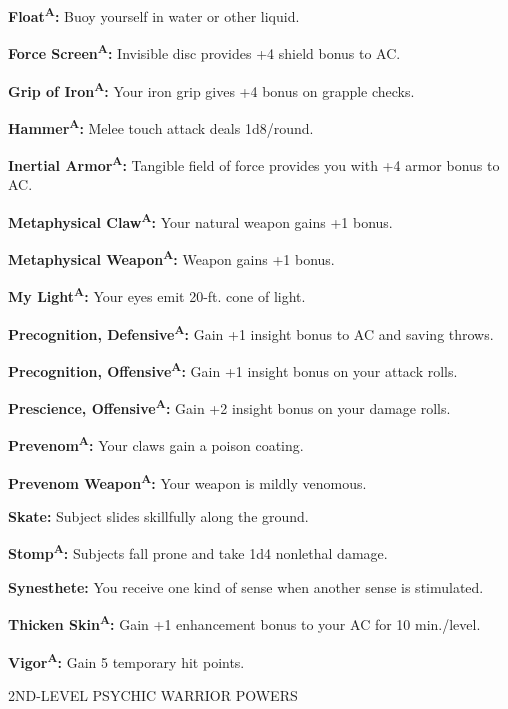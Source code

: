 \documentclass{article}
\begin{document}
\textbf{Float}\textsuperscript{\textbf{A}}\textbf{: }Buoy yourself in water or 
other liquid.

\textbf{Force Screen}\textsuperscript{\textbf{A}}\textbf{: }Invisible disc provides 
+4 shield bonus to AC.

\textbf{Grip of Iron}\textsuperscript{\textbf{A}}\textbf{: }Your iron grip gives 
+4 bonus on grapple checks.

\textbf{Hammer}\textsuperscript{\textbf{A}}\textbf{: }Melee touch attack deals 
1d8/round.

\textbf{Inertial Armor}\textsuperscript{\textbf{A}}\textbf{: }Tangible field of 
force provides you with +4 armor bonus to AC.

\textbf{Metaphysical Claw}\textsuperscript{\textbf{A}}\textbf{: }Your natural weapon 
gains +1 bonus.

\textbf{Metaphysical Weapon}\textsuperscript{\textbf{A}}\textbf{: }Weapon gains 
+1 bonus.

\textbf{My Light}\textsuperscript{\textbf{A}}\textbf{: }Your eyes emit 20-ft. cone 
of light.

\textbf{Precognition, Defensive}\textsuperscript{\textbf{A}}\textbf{: }Gain +1 
insight bonus to AC and saving throws.

\textbf{Precognition, Offensive}\textsuperscript{\textbf{A}}\textbf{: }Gain +1 
insight bonus on your attack rolls.

\textbf{Prescience, Offensive}\textsuperscript{\textbf{A}}\textbf{: }Gain +2 insight 
bonus on your damage rolls.

\textbf{Prevenom}\textsuperscript{\textbf{A}}\textbf{: }Your claws gain a poison 
coating.

\textbf{Prevenom Weapon}\textsuperscript{\textbf{A}}\textbf{: }Your weapon is mildly 
venomous.

\textbf{Skate: }Subject slides skillfully along the ground.

\textbf{Stomp}\textsuperscript{\textbf{A}}\textbf{: }Subjects fall prone and take 
1d4 nonlethal damage.

\textbf{Synesthete: }You receive one kind of sense when another sense is stimulated.

\textbf{Thicken Skin}\textsuperscript{\textbf{A}}\textbf{: }Gain +1 enhancement 
bonus to your AC for 10 min./level.

\textbf{Vigor}\textsuperscript{\textbf{A}}\textbf{: }Gain 5 temporary hit points.

2ND-LEVEL PSYCHIC WARRIOR POWERS 
\end{document}
